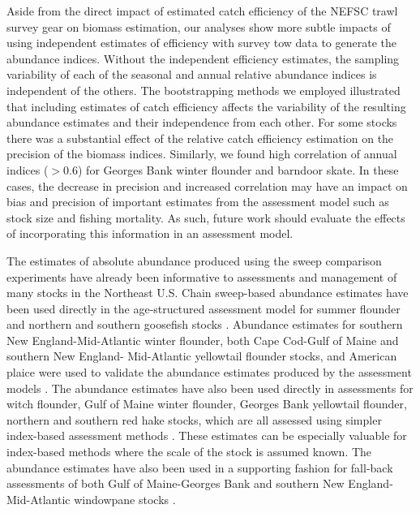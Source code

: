 \documentclass[
  12pt,
]{article}
\begin{document}
Aside from the direct impact of estimated catch efficiency of the NEFSC
trawl survey gear on biomass estimation, our analyses show more subtle
impacts of using independent estimates of efficiency with survey tow
data to generate the abundance indices. Without the independent
efficiency estimates, the sampling variability of each of the seasonal
and annual relative abundance indices is independent of the others. The
bootstrapping methods we employed illustrated that including estimates
of catch efficiency affects the variability of the resulting abundance
estimates and their independence from each other. For some stocks there
was a substantial effect of the relative catch efficiency estimation on
the precision of the biomass indices. Similarly, we found high
correlation of annual indices (\(> 0.6\)) for Georges Bank winter
flounder and barndoor skate. In these cases, the decrease in precision
and increased correlation may have an impact on bias and precision of
important estimates from the assessment model such as stock size and
fishing mortality. As such, future work should evaluate the effects of
incorporating this information in an assessment model.

The estimates of absolute abundance produced using the sweep comparison
experiments have already been informative to assessments and management
of many stocks in the Northeast U.S. Chain sweep-based abundance
estimates have been used directly in the age-structured assessment model
for summer flounder and northern and southern goosefish stocks
\citep{nefsc19, nefsc20b}. Abundance estimates for southern New
England-Mid-Atlantic winter flounder, both Cape Cod-Gulf of Maine and
southern New England- Mid-Atlantic yellowtail flounder stocks, and
American plaice were used to validate the abundance estimates produced
by the assessment models \citep{nefsc20}. The abundance estimates have
also been used directly in assessments for witch flounder, Gulf of Maine
winter flounder, Georges Bank yellowtail flounder, northern and southern
red hake stocks, which are all assessed using simpler index-based
assessment methods \citep{legaultmccurdy17,nefsc20, nefsc20a}. These
estimates can be especially valuable for index-based methods where the
scale of the stock is assumed known. The abundance estimates have also
been used in a supporting fashion for fall-back assessments of both Gulf
of Maine-Georges Bank and southern New England-Mid-Atlantic windowpane
stocks \citep{nefsc20}.
\end{document}
